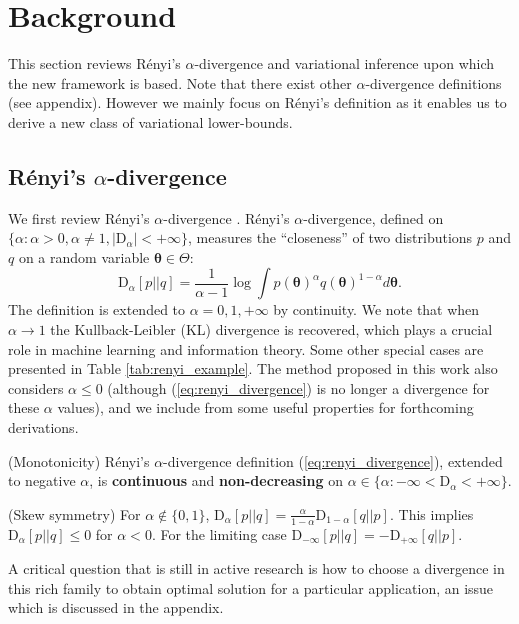 \section{Background}
This section reviews R{\'e}nyi's $\alpha$-divergence and variational inference upon which the new framework is based. Note that there exist other $\alpha$-divergence definitions \citep{amari:divergence, tsallis:divergence} (see appendix). However we mainly focus on R{\'e}nyi's definition as it enables us to derive a new class of variational lower-bounds.

\subsection{R{\'e}nyi's $\alpha$-divergence}

\label{sec:renyi_divergence}
We first review R{\'e}nyi's $\alpha$-divergence \cite{renyi:divergence, van_erven:renyi}. R{\'e}nyi's $\alpha$-divergence, defined on $\{\alpha: \alpha > 0, \alpha \neq 1, |\mathrm{D}_{\alpha}| < +\infty \}$, measures the ``closeness'' of two distributions $p$ and $q$ on a random variable $\bm{\theta} \in \Theta$:
\begin{equation}
\label{eq:renyi_divergence}
\mathrm{D}_{\alpha} [p || q] = \frac{1}{\alpha - 1} \log \int p(\bm{\theta})^{\alpha} q(\bm{\theta})^{1 - \alpha} d \bm{\theta}.
\end{equation}
The definition is extended to $\alpha = 0, 1, +\infty$ by continuity. We note that when $\alpha \rightarrow 1$ the Kullback-Leibler (KL) divergence is recovered, which plays a crucial role in machine learning and information theory. Some other special cases are presented in Table \ref{tab:renyi_example}. The method proposed in this work also considers $\alpha \leq 0$ (although (\ref{eq:renyi_divergence}) is no longer a divergence for these $\alpha$ values), and we include from \cite{van_erven:renyi} some useful properties for forthcoming derivations.
%
\begin{prop}
(Monotonicity) R{\'e}nyi's $\alpha$-divergence definition (\ref{eq:renyi_divergence}), extended to negative $\alpha$, is \textbf{continuous} and \textbf{non-decreasing} on $\alpha \in \{\alpha: -\infty < \mathrm{D}_{\alpha} < +\infty \}$.
\label{prop:renyi_divergence}
\end{prop}
%
\begin{prop}
(Skew symmetry) For $\alpha \not\in \{0, 1\}$, 
$
\mathrm{D}_{\alpha} [p || q] = \frac{\alpha}{1 - \alpha} \mathrm{D}_{1 - \alpha} [q || p].
$
This implies $\mathrm{D}_{\alpha} [p || q] \leq 0$ for $\alpha < 0$. For the limiting case $\mathrm{D}_{-\infty} [p || q] = -\mathrm{D}_{+\infty} [q || p]$.
\label{prop:skew_symmetry}
\end{prop}
%
%

%
A critical question that is still in active research is how to choose a divergence in this rich family to obtain optimal solution for a particular application, an issue which is discussed in the appendix.

